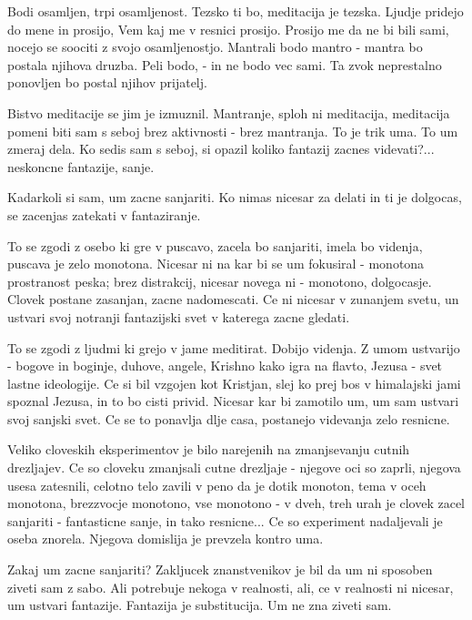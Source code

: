 Bodi osamljen, trpi osamljenost. Tezsko ti bo, meditacija je tezska. Ljudje pridejo do mene in prosijo,  Vem kaj me v resnici prosijo. Prosijo me da ne bi bili sami, nocejo se soociti z svojo osamljenostjo. Mantrali bodo mantro - mantra bo postala njihova druzba. Peli bodo,  - in ne bodo vec sami. Ta zvok  neprestalno ponovljen bo postal njihov prijatelj. 

Bistvo meditacije se jim je izmuznil. Mantranje, sploh ni meditacija, meditacija pomeni biti sam s seboj brez aktivnosti - brez mantranja. To je trik uma. To um zmeraj dela. Ko sedis sam s seboj, si opazil koliko fantazij zacnes videvati?... neskoncne fantazije, sanje. 

Kadarkoli si sam, um zacne sanjariti. Ko nimas nicesar za delati in ti je dolgocas, se zacenjas zatekati v fantaziranje. 

To se zgodi z osebo ki gre v puscavo, zacela bo sanjariti, imela bo videnja, puscava je zelo monotona. Nicesar ni na kar bi se um fokusiral - monotona prostranost peska; brez distrakcij, nicesar novega ni - monotono, dolgocasje. Clovek postane zasanjan, zacne nadomescati. Ce ni nicesar v zunanjem svetu, un ustvari svoj notranji fantazijski svet v katerega zacne gledati. 

To se zgodi z ljudmi ki grejo v jame meditirat. Dobijo videnja. Z umom ustvarijo - bogove in boginje, duhove, angele, Krishno kako igra na flavto, Jezusa - svet lastne ideologije. Ce si bil vzgojen kot Kristjan, slej ko prej bos v himalajski jami spoznal Jezusa, in to bo cisti privid. Nicesar kar bi zamotilo um, um sam ustvari svoj sanjski svet. Ce se to ponavlja dlje casa, postanejo videvanja zelo resnicne. 

Veliko cloveskih eksperimentov je bilo narejenih na zmanjsevanju cutnih drezljajev. Ce so cloveku zmanjsali cutne drezljaje - njegove oci so zaprli, njegova usesa zatesnili, celotno telo zavili v peno da je dotik monoton, tema v oceh monotona, brezzvocje monotono, vse monotono - v dveh, treh urah je clovek zacel sanjariti - fantasticne sanje, in tako resnicne...  Ce so experiment nadaljevali je oseba znorela. Njegova domislija je prevzela kontro uma. 

Zakaj um zacne sanjariti? Zakljucek znanstvenikov je bil da um ni sposoben ziveti sam z sabo. Ali potrebuje nekoga v realnosti, ali, ce v realnosti ni nicesar, um ustvari fantazije. Fantazija je substitucija. Um ne zna ziveti sam. 

